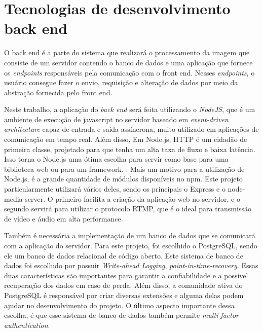\documentclass[12pt, %
openright, 
oneside, %
a4paper,    %
brazil]{facom-ufu-abntex2}
\begin{document}
\section{Tecnologias de desenvolvimento back end}

O back end é a parte do sistema que realizará o processamento da imagem que
consiste de um servidor contendo o banco de dados e uma aplicação que fornece
os \emph{endpoints} responsáveis pela comunicação com o front end. Nesses
\emph{endpoints}, o usuário consegue fazer o envio, requisição e alteração de
dados por meio da abstração fornecida pelo front end.


Neste trabalho, a aplicação do \emph{back end} será feita utilizando o
\emph{NodeJS}, que é um ambiente de execução de javascript no servidor baseado
em \emph{event-driven architecture} capaz de entrada e saída assíncrona, muito
utilizado em aplicações de comunicação em tempo real. \cite{aboutnodejs} Além
disso, Em Node.js, HTTP é um cidadão de primeira classe, projetado para que
tenha um alta taxa de fluxo e baixa latência. Isso torna o Node.js uma ótima
escolha para servir como base para uma biblioteca web ou para um framework.
\cite{NodeJSaboutoriginal}. Mais um motivo para a utilização de Node.js, é a
grande quantidade de módulos disponíveis no npm. Este projeto particularmente
utilizará vários deles, sendo os principais o Express e o node-media-server. O
primeiro facilita a criação da aplicação web no servidor, e o segundo servirá
para utilizar o protocolo RTMP, que é o ideal para transmissão de vídeo e áudio
em alta performance.

Também é necessária a implementação de um banco de dados que se comunicará com
a aplicação do servidor. Para este projeto, foi escolhido o PostgreSQL, sendo
ele um banco de dados relacional de código aberto. Este sistema de banco de
dados foi escolhido por possuir \emph{Write-ahead Logging},
\emph{point-in-time-recovery}. Essas duas características são importantes para
garantir a confiabilidade e a possível recuperação dos dados em caso de perda.
Além disso, a comunidade ativa do PostgreSQL é responsável por criar diversas
extensões e alguma delas podem ajudar no desenvolvimento do projeto. O último
aspecto importante dessa escolha, é que esse sistema de banco de dados também
permite \emph{multi-factor authentication}. \cite{aboutPostgre}
\end{document}
